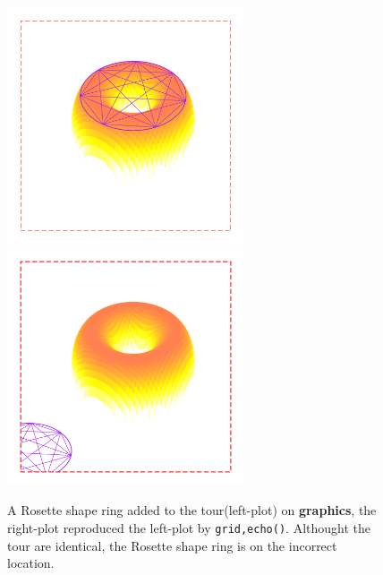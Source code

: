 \documentclass[paper=a4, fontsize=11pt]{report}
\begin{document}
\begin{figure}[h]
	\begin{center}
		\includegraphics[height = 7cm, width = 7cm]{figure/gridGraphics_persp_demo_viewport2_1.pdf}
		\includegraphics[height = 7cm, width = 7cm]{figure/gridGraphics_persp_demo_viewport2_2.pdf}
		\caption{A Rosette shape ring added to the tour(left-plot) on \textbf{graphics}, the right-plot reproduced the left-plot by \texttt{grid,echo()}. Althought the tour are identical, the Rosette shape ring is on the incorrect location.}
		\label{figure_4.4}
	\end{center}
\end{figure}
\end{document}
